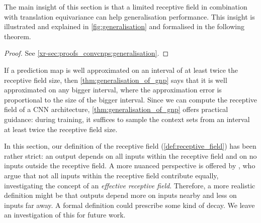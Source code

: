 \documentclass[12pt]{report}
\newcommand{\xrprefix}[1]{xr-#1}
\begin{document}
The main insight of this section is that a limited receptive field in combination with translation equivariance can help generalisation performance.
This insight is illustrated and explained in \cref{fig:generalisation} and formalised in the following theorem.

\begin{proof}
    See \cref{\xrprefix{sec:proofs_convcnps:generalisation}}.
\end{proof}


If a prediction map is well approximated on an interval of at least twice the receptive field size, then \cref{thm:generalisation_of_gnp} says that it is well approximated on any bigger interval, where the approximation error is proportional to the size of the bigger interval.
Since we can compute the receptive field of a CNN architecture, \cref{thm:generalisation_of_gnp} offers practical guidance: 
during training, it suffices to sample the context sets from an interval at least twice the receptive field size.

In this section, our definition of the receptive field (\cref{def:receptive_field}) has been rather strict:
an output depends on all inputs within the receptive field 
and on no inputs outside the receptive field.
A more nuanced perspective is offered by \textcite{Luo:2016:Understanding_the_Effective_Receptive_Field}, who argue that not all inputs within the receptive field contribute equally, investigating the concept of an \emph{effective receptive field}.
Therefore, a more realistic definition might be that outputs depend more on inputs nearby and less on inputs far away.
A formal definition could prescribe some kind of decay.
We leave an investigation of this for future work.
\end{document}
